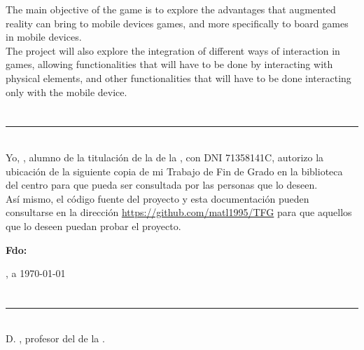 {{The main objective of the game is to explore the advantages that augmented reality can bring to mobile devices games, and more specifically to board games in mobile devices.\\

The project will also explore the integration of different ways of interaction in games, allowing functionalities that will have to be done by interacting with physical elements, and other functionalities that will have to be done interacting only with the mobile device.\\

\chapter*{}
\thispagestyle{empty}

\noindent\rule[-1ex]{\textwidth}{2pt}\\[4.5ex]

Yo, \textbf{\autor}, alumno de la titulación \textbf{\grado} de la \textbf{\escuela} de la \textbf{\universidad}, con DNI 71358141C, autorizo la ubicación de la siguiente copia de mi Trabajo de Fin de Grado en la biblioteca del centro para que pueda ser consultada por las personas que lo deseen.\\

Así mismo, el código fuente del proyecto y esta documentación pueden consultarse en la dirección \url{https://github.com/matl1995/TFG} para que aquellos que lo deseen puedan probar el proyecto.

\vspace{5cm}

\noindent \textbf{Fdo: \autor}

\vspace{2cm}

\begin{flushright}
\ciudad, a \today
\end{flushright}

\chapter*{}
\thispagestyle{empty}

\noindent\rule[-1ex]{\textwidth}{2pt}\\[4.5ex]

D. \textbf{\tutor}, profesor del \textbf{\departamento} de la \textbf{\universidad}.

\vspace{0.5cm}

}}
